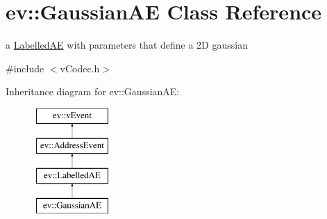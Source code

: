\hypertarget{classev_1_1GaussianAE}{}\section{ev\+:\+:Gaussian\+AE Class Reference}
\label{classev_1_1GaussianAE}


a \hyperlink{classev_1_1LabelledAE}{Labelled\+AE} with parameters that define a 2D gaussian  




{\ttfamily \#include $<$v\+Codec.\+h$>$}

Inheritance diagram for ev\+:\+:Gaussian\+AE\+:\begin{figure}[H]
\begin{center}
\leavevmode
\includegraphics[height=4.000000cm]{classev_1_1GaussianAE}
\end{center}
\end{figure}
